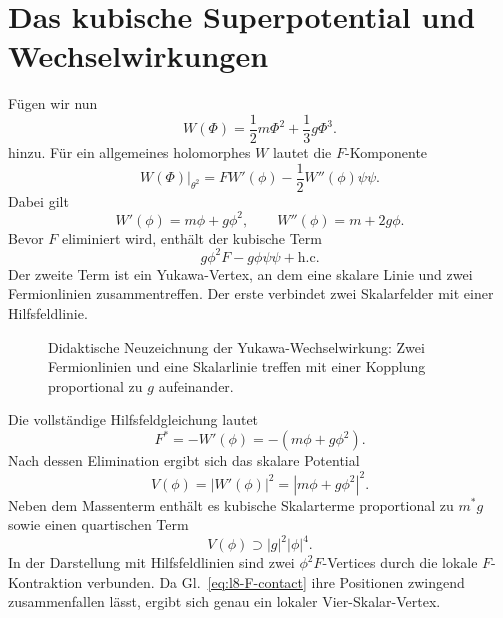 \section{Das kubische Superpotential und Wechselwirkungen}

Fügen wir nun
\begin{equation}
W(\Phi)=\frac12m\Phi^2+\frac13g\Phi^3.
\label{eq:l8-superpotential}
\end{equation}
hinzu. Für ein allgemeines holomorphes \(W\) lautet die \(F\)-Komponente
\begin{equation}
\left.W(\Phi)\right|_{\theta^2}
=F W'(\phi)-\frac12W''(\phi)\psi\psi.
\label{eq:l8-W-components}
\end{equation}
Dabei gilt
\begin{equation}
W'(\phi)=m\phi+g\phi^2,
\qquad
W''(\phi)=m+2g\phi.
\end{equation}
Bevor \(F\) eliminiert wird, enthält der kubische Term
\begin{equation}
g\phi^2F-g\phi\psi\psi+\text{h.c.}
\label{eq:l8-cubic-offshell}
\end{equation}
Der zweite Term ist ein Yukawa-Vertex, an dem eine skalare Linie und zwei Fermionlinien zusammentreffen. Der erste verbindet zwei Skalarfelder mit einer Hilfsfeldlinie.

\begin{figure}[H]
\centering
{}
\caption{Didaktische Neuzeichnung der Yukawa-Wechselwirkung: Zwei Fermionlinien und eine Skalarlinie treffen mit einer Kopplung proportional zu \(g\) aufeinander.}
\end{figure}

Die vollständige Hilfsfeldgleichung lautet
\begin{equation}
F^\ast=-W'(\phi)=-(m\phi+g\phi^2).
\label{eq:l8-general-F-equation}
\end{equation}
Nach dessen Elimination ergibt sich das skalare Potential
\begin{equation}
V(\phi)=|W'(\phi)|^2
=|m\phi+g\phi^2|^2.
\label{eq:l8-scalar-potential}
\end{equation}
Neben dem Massenterm enthält es kubische Skalarterme proportional zu \(m^\ast g\) sowie einen quartischen Term
\begin{equation}
V(\phi)\supset |g|^2|\phi|^4.
\label{eq:l8-quartic}
\end{equation}
In der Darstellung mit Hilfsfeldlinien sind zwei \(\phi^2F\)-Vertices durch die lokale \(F\)-Kontraktion verbunden. Da Gl.~\eqref{eq:l8-F-contact} ihre Positionen zwingend zusammenfallen lässt, ergibt sich genau ein lokaler Vier-Skalar-Vertex.


